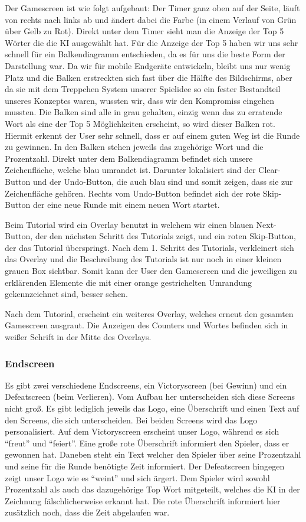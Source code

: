 \documentclass[11pt]{article}
\begin{document}
Der Gamescreen ist wie folgt aufgebaut: Der Timer ganz oben auf der Seite, läuft von rechts nach links ab und ändert dabei die Farbe (in einem Verlauf von Grün über Gelb zu Rot). Direkt unter dem Timer sieht man die Anzeige der Top 5 Wörter die die KI ausgewählt hat. Für die Anzeige der Top 5 haben wir uns sehr schnell für ein Balkendiagramm entschieden, da es für uns die beste Form der Darstellung war. 
Da wir für mobile Endgeräte entwickeln, bleibt uns nur wenig Platz und die Balken erstreckten sich fast über die Hälfte des Bildschirms, aber da sie mit dem Treppchen System unserer Spielidee so ein fester Bestandteil unseres Konzeptes waren, wussten wir, dass wir den Kompromiss eingehen mussten. 
Die Balken sind alle in grau gehalten, einzig wenn das zu erratende Wort als eine der Top 5 Möglichkeiten erscheint, so wird dieser Balken rot. Hiermit erkennt der User sehr schnell, dass er auf einem guten Weg ist die Runde zu gewinnen. In den Balken stehen jeweils das zugehörige Wort und die Prozentzahl. 
Direkt unter dem Balkendiagramm befindet sich unsere Zeichenfläche, welche blau umrandet ist. Darunter lokalisiert sind der Clear-Button und der Undo-Button, die auch blau sind und somit zeigen, dass sie zur Zeichenfläche gehören. Rechts vom Undo-Button befindet sich der rote Skip-Button der eine neue Runde mit einem neuen Wort startet.

Beim Tutorial wird ein Overlay benutzt in welchem wir einen blauen Next-Button, der den nächsten Schritt des Tutorials zeigt, und ein roten Skip-Button, der das Tutorial überspringt. Nach dem 1. Schritt des Tutorials, verkleinert sich das Overlay und die Beschreibung des Tutorials ist nur noch in einer kleinen grauen Box sichtbar. 
Somit kann der User den Gamescreen und die jeweiligen zu erklärenden Elemente die mit einer orange gestrichelten Umrandung gekennzeichnet sind, besser sehen.

Nach dem Tutorial, erscheint ein weiteres Overlay, welches erneut den gesamten Gamescreen ausgraut. Die Anzeigen des Counters und Wortes befinden sich in weißer Schrift in der Mitte des Overlays.


\subsubsection{Endscreen}

Es gibt zwei verschiedene Endscreens, ein Victoryscreen (bei Gewinn) und ein Defeatscreen (beim Verlieren). Vom Aufbau her unterscheiden sich diese Screens nicht groß. Es gibt lediglich jeweils das Logo, eine Überschrift und einen Text auf den Screens, die sich unterscheiden. Bei beiden Screens wird das Logo personalisiert. 
Auf dem Victoryscreen erscheint unser Logo, während es sich “freut” und “feiert”. Eine große rote Überschrift informiert den Spieler, dass er gewonnen hat. Daneben steht ein Text welcher den Spieler über seine Prozentzahl und seine für die Runde benötigte Zeit informiert. 
Der Defeatscreen hingegen zeigt unser Logo wie es “weint” und sich ärgert. Dem Spieler wird sowohl Prozentzahl als auch das dazugehörige Top Wort mitgeteilt, welches die KI in der Zeichnung fälschlicherweise erkannt hat. Die rote Überschrift informiert hier zusätzlich noch, dass die Zeit abgelaufen war. 
\end{document}
